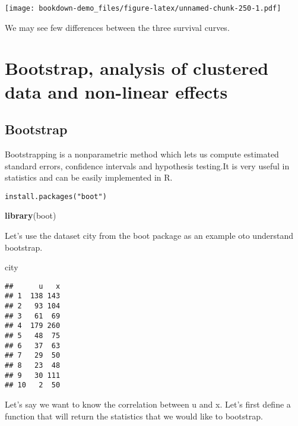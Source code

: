 \documentclass[]{book}
\newenvironment{Shaded}{\begin{snugshade}}{\end{snugshade}}
\newcommand{\KeywordTok}[1]{\textcolor[rgb]{0.13,0.29,0.53}{\textbf{#1}}}
\newcommand{\CommentTok}[1]{\textcolor[rgb]{0.56,0.35,0.01}{\textit{#1}}}
\newcommand{\ControlFlowTok}[1]{\textcolor[rgb]{0.13,0.29,0.53}{\textbf{#1}}}
\newcommand{\OperatorTok}[1]{\textcolor[rgb]{0.81,0.36,0.00}{\textbf{#1}}}
\newcommand{\NormalTok}[1]{#1}
\theoremstyle{definition}
\theoremstyle{definition}
\theoremstyle{definition}
\theoremstyle{remark}
\begin{document}
\texttt{[image: bookdown-demo\_files/figure-latex/unnamed-chunk-250-1.pdf]}

We may see few differences between the three survival curves.

\chapter{Bootstrap, analysis of clustered data and non-linear
effects}\label{bootstrap-analysis-of-clustered-data-and-non-linear-effects}

\section{Bootstrap}\label{bootstrap}

Bootstrapping is a nonparametric method which lets us compute estimated
standard errors, confidence intervals and hypothesis testing.It is very
useful in statistics and can be easily implemented in R.

\begin{verbatim}
install.packages("boot")
\end{verbatim}

\begin{Shaded}
\begin{Highlighting}[]
\KeywordTok{library}\NormalTok{(boot)}
\end{Highlighting}
\end{Shaded}

Let's use the dataset city from the boot package as an example oto
understand bootstrap.

\begin{Shaded}
\begin{Highlighting}[]
\NormalTok{city}
\end{Highlighting}
\end{Shaded}

\begin{verbatim}
##      u   x
## 1  138 143
## 2   93 104
## 3   61  69
## 4  179 260
## 5   48  75
## 6   37  63
## 7   29  50
## 8   23  48
## 9   30 111
## 10   2  50
\end{verbatim}

Let's say we want to know the correlation between u and x. Let's first
define a function that will return the statistics that we would like to
bootstrap.

\begin{Shaded}
\end{Shaded}
\end{document}
